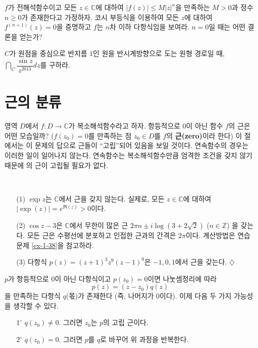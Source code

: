 \begin{salt_exercise} \label{ex-4-15}
$f$가 전해석함수이고 모든 $z\in\mathbb C$에 대하여
$|f(z)| \le M|z|^n$을 만족하는  $M>0$과 정수 $n\ge0$가 존재한다고 가정하자.
코시 부등식을 이용하여 모든 $z$에 대하여 $f^{(n+1)}(z) = 0$을 증명하고
$f$는 $n$차 이하 다항식임을 보여라. $n=0$일 때는 어떤 결론을 얻는가?
\end{salt_exercise}

\begin{salt_exercise} \label{ex-4-16}
$C$가 원점을 중심으로 반지름 $1$인 원을 반시계방향으로 도는 원형 경로일 때,
$\dint_C \dfrac{\sin z}{z^{2013}}dz$를 구하라.
\end{salt_exercise}

\section{근의 분류}

영역 $D$에서  $f: D\to \mathbb C$가 복소해석함수라고 하자.
항등적으로 $0$이 아닌 함수 $f$의 근은 어떤 모습일까?
($f(z_0)=0$를 만족하는 점 $z_0\in D$를 $f$의 {\bf 근(zero)}이라 한다)
이 절에서는 이 문제의 답으로 근들이 ``고립''되어 있음을 보일 것이다.
연속함수의 경우는 이러한 일이 일어나지 않는다. 
연속함수는 복소해석함수만큼 엄격한 조건을 갖지 않기 때문에
의 근이 고립될 필요가 없다.

\begin{salt_example}\label{example-4-5}
\
\begin{itemize}
\item[(1)] $\exp z$는 $\mathbb C$에서 근을 갖지 않는다.
실제로, 모든 $z\in \mathbb C$에 대하여 $|\exp(z)| = e^{\Re(z)} >0$이다.
\item[(2)] $\cos z - 3$은 $\mathbb C$에서 무한이 많은 근 
$2\pi n \pm i \log(3+2\sqrt{2})$ ($n\in\mathbb Z$)
을 갖는다.
모든 근은 수평선에 분포하고 인접한 근과의 간격은 $2\pi$이다.
계산방법은 연습문제 \ref{ex-1-38}을 참고하라.
\item[(3)] 다항식 $p(z) = (z+1)^3z^9(z-1)^9$은 $-1, 0, 1$에서 근을 갖는다. 
\hfill $\diamondsuit$
\end{itemize}
\end{salt_example}

$p$가 항등적으로 $0$이 아닌 다항식이고 $p(z_0)=0$이면
나눗셈정리에 따라 
\[
p(z) = (z-z_0) q(z)
\]
을 만족하는 다항식 $q$(몫)가 존재한다
(즉, 나머지가 $0$이다). 
이제 다음 두 가지  가능성을 생각할 수 있다.
\begin{itemize}
\item[$1^\circ$] $q(z_0) \ne0$. 그러면 $z_0$는 $p$의 고립 근이다.
\item[$2^\circ$] $q(z_0) =0$. 그러면 $p$를 $q$로 바꾸어 위 과정을 반복한다.
\end{itemize}

